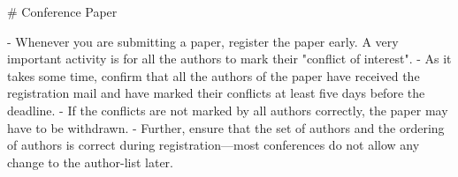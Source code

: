 # Conference Paper 

- Whenever you are submitting a paper, register the paper early. A very important activity is for all the authors to mark their "conflict of interest". 
- As it takes some time, confirm that all the authors of the paper have received the registration mail and have marked their conflicts at least five days before the deadline. 
- If the conflicts are not marked by all authors correctly, the paper may have to be withdrawn. 
- Further, ensure that the set of authors and the ordering of authors is correct during registration---most conferences do not allow any change to the author-list later.
